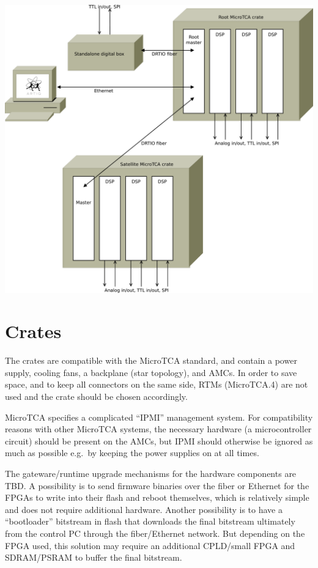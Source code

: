 \documentclass[11pt]{paper}
\begin{document}
\includegraphics[width=\textwidth]{overview.pdf}

\section{Crates}
The crates are compatible with the MicroTCA standard, and contain a power supply, cooling fans, a backplane (star topology), and AMCs. In order to save space, and to keep all connectors on the same side, RTMs (MicroTCA.4) are not used and the crate should be chosen accordingly.

MicroTCA specifies a complicated ``IPMI'' management system. For compatibility reasons with other MicroTCA systems, the necessary hardware (a microcontroller circuit) should be present on the AMCs, but IPMI should otherwise be ignored as much as possible e.g.\ by keeping the power supplies on at all times.

The gateware/runtime upgrade mechanisms for the hardware components are TBD. A possibility is to send firmware binaries over the fiber or Ethernet for the FPGAs to write into their flash and reboot themselves, which is relatively simple and does not require additional hardware. Another possibility is to have a ``bootloader'' bitstream in flash that downloads the final bitstream ultimately from the control PC through the fiber/Ethernet network. But depending on the FPGA used, this solution may require an additional CPLD/small FPGA and SDRAM/PSRAM to buffer the final bitstream.
\end{document}
